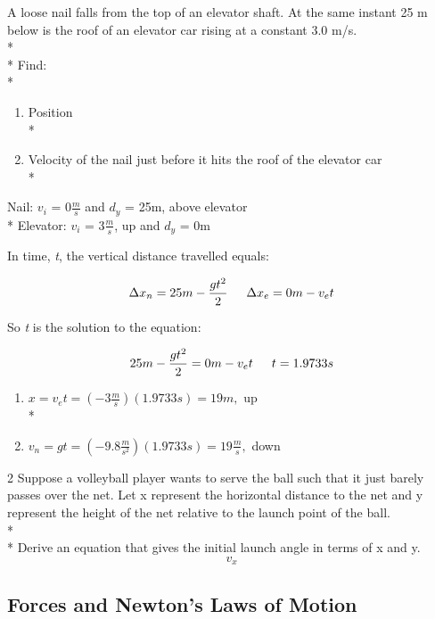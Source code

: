 \documentclass{article}
\begin{document}
\begin{multicols}{2}
A loose nail falls from the top of an elevator shaft.  At the same instant 25 m below is the roof of an elevator car rising at a constant 3.0 m/s. \\*\\* Find: \\*
\begin{enumerate}[label=\alph*]
\item Position \\*
\item Velocity of the nail just before it hits the roof of the elevator car\\*
\end{enumerate}
Nail: $v_i$ = 0$\frac{m}{s}$ and $d_y$ = 25m, above elevator\\*
Elevator: $v_i$ = 3$\frac{m}{s}$, up and $d_y$ = 0m

\columnbreak

In time, \textit{t}, the vertical distance travelled equals:

\[\Delta{x_n}=25m-\frac{gt^2}{2} \indent \Delta{x_e}=0m-v_et\]

So \textit{t} is the solution to the equation:

\[25m-\frac{gt^2}{2}=0m-v_et \indent t=1.9733s\]

\begin{enumerate}[label=\alph*]
\item $x=v_et=(-3\frac{m}{s})(1.9733s)=19m,$ up \\*
\item $v_n=gt=(-9.8\frac{m}{s^2})(1.9733s)=19\frac{m}{s},$ down
\end{enumerate}

\end{multicols}

\begin {multicols}{2}
Suppose a volleyball player wants to serve the ball such that it just barely passes over the net.  Let x represent the horizontal distance to the net and y represent the height of the net relative to the launch point of the ball.
\\*\\*
Derive an equation that gives the initial launch angle in terms of x and y.
\columnbreak
\[v_x\]
\end{multicols}

\subsection{Forces and Newton's Laws of Motion}
\end{document}
